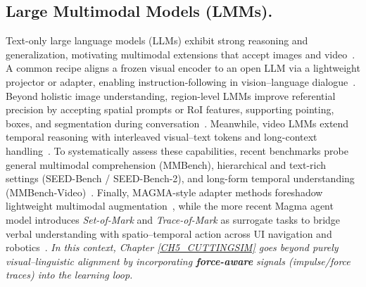 \subsection{Large Multimodal Models (LMMs).}
    Text-only large language models (LLMs) exhibit strong reasoning and generalization, motivating multimodal extensions that accept images and video~\citep{achiam2023gpt}. A common recipe aligns a frozen visual encoder to an open LLM via a lightweight projector or adapter, enabling instruction-following in vision--language dialogue~\citep{radford2021clip,liu2023llava,zhu2023minigpt4}. Beyond holistic image understanding, region-level LMMs improve referential precision by accepting spatial prompts or RoI features, supporting pointing, boxes, and segmentation during conversation~\citep{cai2023vipllava,rasheed2024glamm,chen2023shikra,zhang2024gpt4roi}. Meanwhile, video LMMs extend temporal reasoning with interleaved visual--text tokens and long-context handling~\citep{ataallah2024minigpt4video,li2024llavainterleave}. To systematically assess these capabilities, recent benchmarks probe general multimodal comprehension (MMBench), hierarchical and text-rich settings (SEED-Bench / SEED-Bench-2), and long-form temporal understanding (MMBench-Video)~\citep{liu2024mmbench,li2023seedbench,li2023seedbench2,fang2024mmbenchvideo}. Finally, MAGMA-style adapter methods foreshadow lightweight multimodal augmentation~\citep{eichenberg2022magma}, while the more recent Magma agent model introduces \emph{Set-of-Mark} and \emph{Trace-of-Mark} as surrogate tasks to bridge verbal understanding with spatio--temporal action across UI navigation and robotics~\citep{yang2025magma}. \emph{In this context, Chapter \ref{CH5_CUTTINGSIM} goes beyond purely visual--linguistic alignment by incorporating \textbf{force-aware} signals (impulse/force traces) into the learning loop.}

